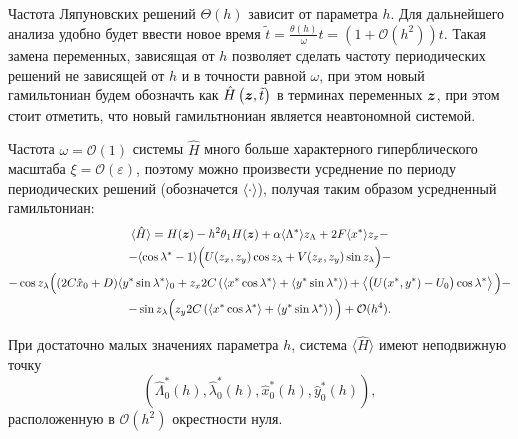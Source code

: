 Частота Ляпуновских решений $\Theta(h)$ зависит от параметра $h$. Для дальнейшего анализа удобно будет ввести новое время $\tilde t = \frac{\theta(h)}{\omega} t = (1+\mathcal{O}(h^2))t$. Такая замена переменных, зависящая от $h$ позволяет сделать частоту периодических решений не зависящей от $h$ и в точности равной ${\omega}$, при этом новый гамильтониан будем обозначть как $\hat H \left( \boldsymbol{z}, \tilde t \right)$ в терминах переменных $\boldsymbol{z}$, при этом стоит отметить, что новый гамильтнониан является неавтономной системой.


Частота $\omega=\mathcal{O}(1)$ системы $\hat H$ много больше характерного гиперблического масштаба ${\xi} = \mathcal{O}(\varepsilon)$, поэтому можно произвести усреднение по периоду периодических решений (обозначется $\langle \cdot \rangle$), получая таким образом усредненный гамильтониан:
\begin{multline}
\langle \hat H \rangle = H(\boldsymbol{z}) - h^2 \theta_1 H(\boldsymbol{z}) + \alpha \langle \Lambda^* \rangle z_\Lambda + 2F \langle x^* \rangle z_x - \\ - \langle \cos \lambda^* -1 \rangle \Big( U(z_x,z_y) \cos z_\lambda + V(z_x,z_y) \sin z_\lambda \Big) - \\
- \cos z_\lambda \Big( (2C \hat x_0 +  D) \langle y^* \sin \lambda^* \rangle_0 + z_x 2C \left( \left\langle x^* \cos \lambda^* \right\rangle + \left\langle y^* \sin \lambda^* \right\rangle \right) + \left\langle \big( U(x^*,y^*) - U_0 \big) \cos \lambda^* \right\rangle \Big) - \\
- \sin z_\lambda \Big( z_y 2C \left( \left\langle x^* \cos \lambda^* \right\rangle + \left\langle y^* \sin \lambda^* \right\rangle \right) \Big) + \mathcal{O}(h^4).
\label{avg_ham}
\end{multline}



При достаточно малых значениях параметра $h$, система $\langle \hat H \rangle$ имеют неподвижную точку 
\begin{equation}
(\hat \Lambda_0^*(h), \hat \lambda_0^*(h), \hat x_0^*(h), \hat y_0^*(h)),
\label{hatHfp}
\end{equation}
расположенную в $\mathcal{O}(h^2)$ окрестности нуля. 

